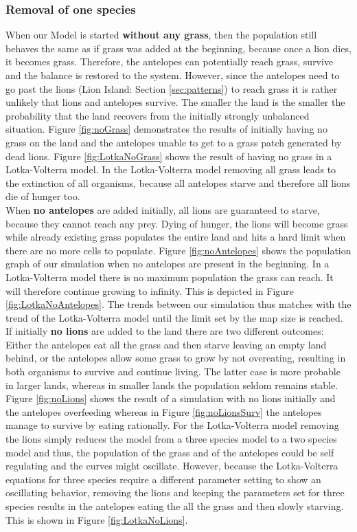 \documentclass[11pt]{article}
\begin{document}
\subsubsection{Removal of one species}
\label{sec:DiscRemovalOfOne}
When our Model is started {\bf without any grass}, then the population still behaves the same as if grass was added at the beginning, because once a lion dies, it becomes grass. Therefore, the antelopes can potentially reach grass, survive and the balance is restored to the system. However, since the antelopes need to go past the lions (Lion Island: Section \ref{sec:patterns}) to reach grass it is rather unlikely that lions and antelopes survive. The smaller the land is the smaller the probability that the land recovers from the initially strongly unbalanced situation. Figure \ref{fig:noGrass} demonstrates the results of initially having no grass on the land and the antelopes unable to get to a grass patch generated by dead lions. Figure \ref{fig:LotkaNoGrass} shows the result of having no grass in a Lotka-Volterra model. In the Lotka-Volterra model removing all grass leads to the extinction of all organisms, because all antelopes starve and therefore all lions die of hunger too.\\

When {\bf no antelopes} are added initially, all lions are guaranteed to starve, because they cannot reach any prey. Dying of hunger, the lions will become grass while already existing grass populates the entire land and hits a hard limit when there are no more cells to populate. Figure \ref{fig:noAntelopes} shows the population graph of our simulation when no antelopes are present in the beginning. In a Lotka-Volterra model there is no maximum population the grass can reach. It will therefore continue growing to infinity. This is depicted in Figure \ref{fig:LotkaNoAntelopes}. The trends between our simulation thus matches with the trend of the Lotka-Volterra model until the limit set by the map size is reached.\\

If initially {\bf no lions} are added to the land there are two different outcomes: Either the antelopes eat all the grass and then starve leaving an empty land behind, or the antelopes allow some grass to grow by not overeating, resulting in both organisms to survive and continue living. The latter case is more probable in larger lands, whereas in smaller lands the population seldom remains stable. Figure \ref{fig:noLions} shows the result of a simulation with no lions initially and the antelopes overfeeding whereas in Figure \ref{fig:noLionsSurv} the antelopes manage to survive by eating rationally. For the Lotka-Volterra model removing the lions simply reduces the model from a three species model to a two species model and thus, the population of the grass and of the antelopes could be self regulating and the curves might oscillate. However, because the Lotka-Volterra equations for three species require a different parameter setting to show an oscillating behavior, removing the lions and keeping the parameters set for three species results in the antelopes eating the all the grass and then slowly starving. This is shown in Figure \ref{fig:LotkaNoLions}.
\end{document}

